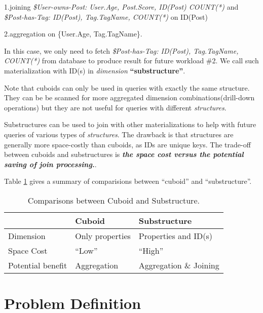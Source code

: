 1.joining \textit{\$User-owns-Post: User.Age, Post.Score, ID(Post) COUNT(*)} and \textit{\$Post-has-Tag: ID(Post), Tag.TagName, COUNT(*)} on ID(Post)

2.aggregation on \{User.Age, Tag.TagName\}. 

In this case, we only need to fetch \textit{\$Post-has-Tag: ID(Post), Tag.TagName, COUNT(*)} from database to produce result for future workload \#2. We call such materialization with ID(s) in \textit{dimension} \textbf{``substructure''}. 

Note that cuboids can only be used in queries with exactly the same structure. They can be be scanned for more aggregated dimension combinations(drill-down operations) but they are not useful for queries with different \textit{structures}. 

Substructures can be used to join with other materializations to help with future queries of various types of \textit{structures}.
The drawback is that structures are generally more space-costly than cuboids, as IDs are unique keys. The trade-off between cuboids and substructures is \textbf{\textit{the space cost versus the potential saving of join processing.}}.

Table \ref{Table:3:1} gives a summary of comparisions between ``cuboid'' and ``substructure''. 

 \begin{table}
	\footnotesize
\begin {center}
\begin{tabular}{ | l | l | l |}
	\hline
 &Cuboid&Substructure\\ \hline
 Dimension& Only properties& Properties and ID(s)\\ \hline
 Space Cost& ``Low''&``High''\\ \hline
 Potential benefit& Aggregation& Aggregation \& Joining\\ \hline
\end{tabular}
\end {center}
\caption{Comparisons between Cuboid and Substructure.}
\label{Table:3:1}
\end{table}


\section{Problem Definition}
\label{sec:Problem Definition}

